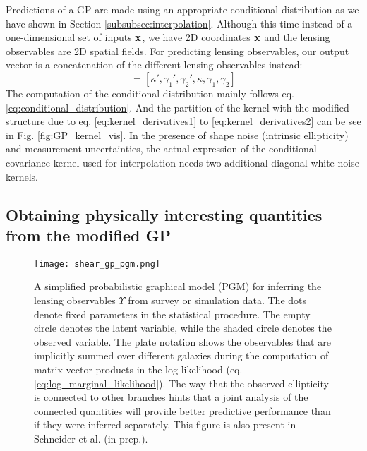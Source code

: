Predictions of a GP are made using an appropriate conditional distribution as we have
shown in Section \ref{subsubsec:interpolation}. Although this time instead of a
one-dimensional set of inputs $\mathbf{x}$, we have 2D coordinates $\mathbf{x}$ and the
lensing observables are 2D spatial fields.
For predicting lensing observables, our output vector is a concatenation of the
different lensing observables instead: 
\begin{equation}
[\lensparams', \lensparams]  = [\kappa', \gamma_1', \gamma_2', \kappa,
\gamma_1, \gamma_2] 
\end{equation}
The computation of the
conditional distribution mainly follows eq. \ref{eq:conditional_distribution}.
And the partition of the kernel with the modified structure due to eq.
\ref{eq:kernel_derivatives1} to \ref{eq:kernel_derivatives2}
can be see in Fig. \ref{fig:GP_kernel_vis}.
In the presence of shape noise (intrinsic ellipticity) and measurement uncertainties, the actual 
expression of the conditional covariance kernel used for interpolation  
needs two additional diagonal white noise kernels.  

% 
\subsection{Obtaining physically interesting quantities from the modified GP}
\begin{figure}
	\centering
	\texttt{[image: shear\_gp\_pgm.png]}
	\caption{A simplified probabilistic graphical model (PGM) for inferring
		the lensing observables $\Upsilon$ from survey or simulation data. The dots
		denote fixed parameters in the statistical procedure. The empty circle denotes
		the latent variable, while the shaded circle denotes 
		the observed variable. The plate notation shows the observables that are
		implicitly summed over different galaxies during the computation of matrix-vector
		products in the log likelihood (eq. \ref{eq:log_marginal_likelihood}). The way that the observed
		ellipticity is connected to other branches hints that a joint analysis of
		the connected quantities will provide better predictive performance than if
		they were inferred separately. This figure is also present in Schneider et
		al. (in prep.).
		\label{fig:simplified_pgm}}
\end{figure}


